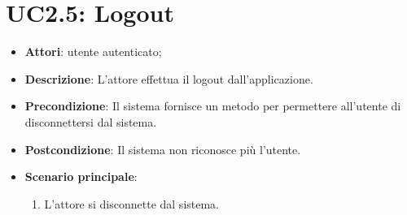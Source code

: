 \section{UC2.5: Logout}
\label{UC2.5}
\begin{itemize}
	\item \textbf{Attori}: utente autenticato;
	\item \textbf{Descrizione}: L'attore effettua il logout dall'applicazione.
	\item \textbf{Precondizione}: Il sistema fornisce un metodo per permettere all'utente di disconnettersi dal sistema.
	\item \textbf{Postcondizione}: Il sistema non riconosce più l'utente.
	\item \textbf{Scenario principale}:
	\begin{enumerate} \item L'attore si disconnette dal sistema.\end{enumerate}
\end{itemize}

